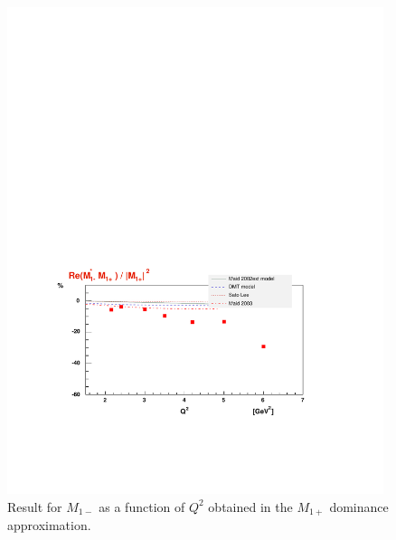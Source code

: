 \begin{figure}[h]
 \begin{center}
 \includegraphics[width = 11cm, bb=30 120 520 400]{analysis/img/M1m} 
  \caption[Amplitude of $M_{1-}$]
{  Result for  $M_{1-}$ as a function of $Q^2$ obtained in the $M_{1+}$ dominance approximation.}
 \label{fig:M1m}

\end{center}
\end{figure}
